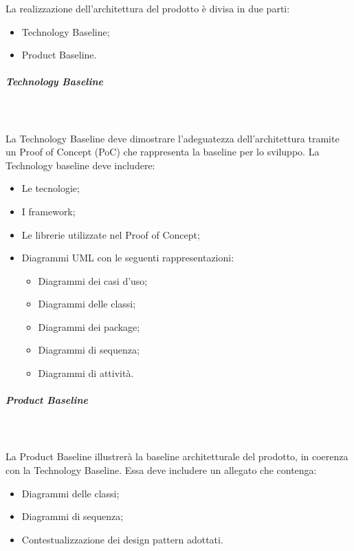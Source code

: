 La realizzazione dell’architettura del prodotto è divisa in due parti:
\begin{itemize}
	\item Technology Baseline;
	\item Product Baseline.
\end{itemize}

\subparagraph{Technology Baseline}\mbox{}\\ \\
La Technology Baseline deve dimostrare l’adeguatezza dell’architettura tramite un Proof of Concept (PoC) che rappresenta la baseline per lo sviluppo. 
La Technology baseline deve includere:
\begin{itemize}
	\item Le tecnologie;
	\item I framework;
	\item Le librerie utilizzate nel Proof of Concept;
	\item Diagrammi UML con le seguenti rappresentazioni:
	\begin{itemize}
		\item Diagrammi dei casi d'uso; 
		\item Diagrammi delle classi; 
		\item Diagrammi dei package;
		\item Diagrammi di sequenza; 
		\item Diagrammi di attività.
	\end{itemize}
\end{itemize}

\subparagraph{Product Baseline}\mbox{}\\ \\
La Product Baseline illustrerà la baseline architetturale del prodotto, in coerenza con la Technology Baseline.
Essa deve includere un allegato che contenga:
\begin{itemize}
	\item Diagrammi delle classi;
	\item Diagrammi di sequenza;
	\item Contestualizzazione dei design pattern adottati.	
\end{itemize}